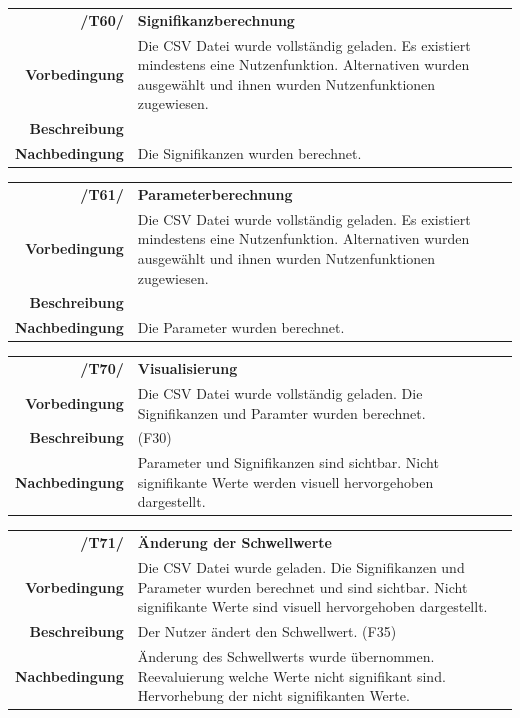 \documentclass{article}
\begin{document}
\begin{table}[H]
\begin{tabularx}{\textwidth}{rX}
\textbf{/T60/}         & \textbf{Signifikanzberechnung} \\
\textbf{Vorbedingung}  & Die CSV Datei wurde vollständig geladen. Es existiert mindestens eine Nutzenfunktion. Alternativen wurden ausgewählt und ihnen wurden Nutzenfunktionen zugewiesen. \\
\textbf{Beschreibung}  &  \\
\textbf{Nachbedingung} & Die Signifikanzen wurden berechnet.
\end{tabularx}
\end{table}

\begin{table}[H]
\begin{tabularx}{\textwidth}{rX}
\textbf{/T61/}         & \textbf{Parameterberechnung} \\
\textbf{Vorbedingung}  & Die CSV Datei wurde vollständig geladen. Es existiert mindestens eine Nutzenfunktion. Alternativen wurden ausgewählt und ihnen wurden Nutzenfunktionen zugewiesen. \\
\textbf{Beschreibung}  &  \\
\textbf{Nachbedingung} & Die Parameter wurden berechnet.
\end{tabularx}
\end{table}

\begin{table}[H]
\begin{tabularx}{\textwidth}{rX}
\textbf{/T70/}         & \textbf{Visualisierung} \\
\textbf{Vorbedingung}  & Die CSV Datei wurde vollständig geladen. Die Signifikanzen und Paramter wurden berechnet. \\
\textbf{Beschreibung}  & (F30) \\
\textbf{Nachbedingung} & Parameter und Signifikanzen sind sichtbar. Nicht signifikante Werte werden visuell hervorgehoben dargestellt.
\end{tabularx}
\end{table}

\begin{table}[H]
\begin{tabularx}{\textwidth}{rX}
\textbf{/T71/}         & \textbf{Änderung der Schwellwerte} \\
\textbf{Vorbedingung}  & Die CSV Datei wurde geladen. Die Signifikanzen und Parameter wurden berechnet und sind sichtbar. Nicht signifikante Werte sind visuell hervorgehoben dargestellt.\\
\textbf{Beschreibung}  & Der Nutzer ändert den Schwellwert. (F35) \\
\textbf{Nachbedingung} & Änderung des Schwellwerts wurde übernommen. Reevaluierung welche Werte nicht signifikant sind. Hervorhebung der nicht signifikanten Werte.
\end{tabularx}
\end{table}
\end{document}
